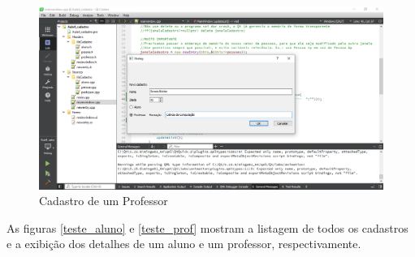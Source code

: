 \documentclass[12pt,a4paper]{article}
\begin{document}
\begin{figure}[h]
    \centering
    \includegraphics[width=\textwidth]{new_prof}
    \caption{Cadastro de um Professor}
    \label{new_prof}
\end{figure}

As figuras \ref{teste_aluno} e \ref{teste_prof} mostram a listagem de todos os cadastros e a exibição dos detalhes de 
um aluno e um professor, respectivamente.
\end{document}
